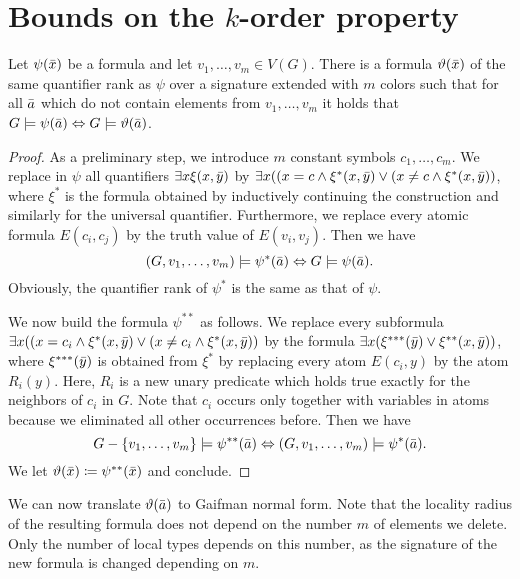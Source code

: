 
\section{Bounds on the $k$-order property}\label{sec:stable}

\begin{theorem}
Let $\psi(\bar{x})$ be a formula and let $v_1,\ldots, v_m\in V(G)$. 
There is a formula $\vartheta(\bar{x})$ 
of the same quantifier rank as $\psi$ over a signature extended 
with $m$ colors such that for all $\bar{a}$ which do not
contain elements from $v_1,\ldots, v_m$ it holds that
$G\models\psi(\bar{a})\Leftrightarrow G\models\vartheta(\bar{a})$. 
\end{theorem}
\begin{proof}
As a preliminary step, we introduce $m$ constant symbols 
$c_1,\ldots, c_m$. We replace in $\psi$ all quantifiers 
$\exists x\xi(x,\bar{y})$ by $\exists x((x=c \wedge \xi^*(x,\bar{y})
\vee (x\neq c\wedge \xi^*(x,\bar{y}))$, 
where $\xi^*$ is the formula obtained by inductively continuing the
construction and similarly for the universal quantifier. Furthermore, 
we replace every atomic formula $E(c_i,c_j)$ by the truth value of
$E(v_i,v_j)$. Then we have
\[(G,v_1,\ldots, v_m)\models\psi^*(\bar{a})\Leftrightarrow G\models\psi(\bar{a}).\]
Obviously, the quantifier rank of $\psi^*$ is the same as that of $\psi$. 

We now build the formula $\psi^{**}$ as follows. We replace
every subformula $\exists x((x=c_i \wedge \xi^*(x,\bar{y}) \vee 
(x\neq c_i \wedge \xi^*(x,\bar{y}))$ by the formula
$\exists x(\xi^{***}(\bar{y}) \vee \xi^{**}(x,\bar{y}))$, 
where $\xi^{***}(\bar{y})$ is obtained from $\xi^{*}$ by
replacing every atom $E(c_i,y)$ by the atom $R_i(y)$. Here, 
$R_i$ is a new unary predicate which holds true exactly for 
the neighbors of $c_i$ in $G$. Note that $c_i$ occurs only together
with variables in atoms because we eliminated all other occurrences
before. Then we have 
\[G-\{v_1,\ldots, v_m\}\models \psi^{**}(\bar{a})
\Leftrightarrow (G,v_1,\ldots, v_m)\models\psi^*(\bar{a}).\]
We let $\vartheta(\bar{x})\coloneqq \psi^{**}(\bar{x})$ and conclude. 
\end{proof}

We can now translate $\vartheta(\bar{a})$ to Gaifman normal form. 
Note that the locality radius of the resulting formula does not depend
on the number $m$ of elements we delete. Only the number of local types
depends on this number, as the signature of the new formula is changed
depending on $m$. 

